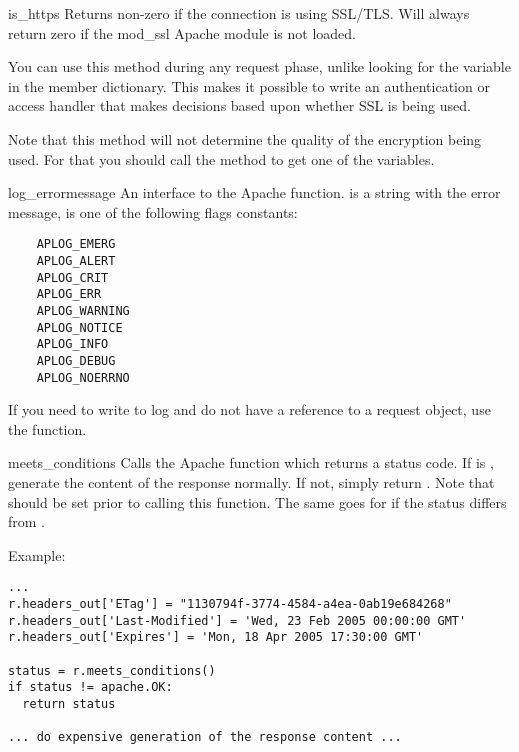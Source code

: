 \begin{methoddesc}[request]{is_https}{}
  Returns non-zero if the connection is using SSL/TLS. Will always return
  zero if the mod_ssl Apache module is not loaded.

  You can use this method during any request phase, unlike looking for
  the  variable in the  member dictionary.
  This makes it possible to write an authentication or access handler
  that makes decisions based upon whether SSL is being used.

  Note that this method will not determine the quality of the
  encryption being used.  For that you should call the 
  method to get one of the  variables.

\end{methoddesc}

\begin{methoddesc}[request]{log_error}{message}
  An interface to the Apache 
  function.  is a string with the error message,
   is one of the following flags constants:

  \begin{verbatim}
    APLOG_EMERG
    APLOG_ALERT
    APLOG_CRIT
    APLOG_ERR
    APLOG_WARNING
    APLOG_NOTICE
    APLOG_INFO
    APLOG_DEBUG
    APLOG_NOERRNO
  \end{verbatim}            

  If you need to write to log and do not have a reference to a request object,
  use the  function.
\end{methoddesc}

\begin{methoddesc}[request]{meets_conditions}{}
  Calls the Apache  function which
  returns a status code.  If  is , generate
  the content of the response normally.  If not, simply return .
  Note that  should be set prior to calling this
  function.  The same goes for  if the status differs
  from .

  Example:
  \begin{verbatim}
...
r.headers_out['ETag'] = "1130794f-3774-4584-a4ea-0ab19e684268"
r.headers_out['Last-Modified'] = 'Wed, 23 Feb 2005 00:00:00 GMT'
r.headers_out['Expires'] = 'Mon, 18 Apr 2005 17:30:00 GMT'

status = r.meets_conditions()
if status != apache.OK:
  return status

... do expensive generation of the response content ... 
\end{verbatim}

\end{methoddesc}


